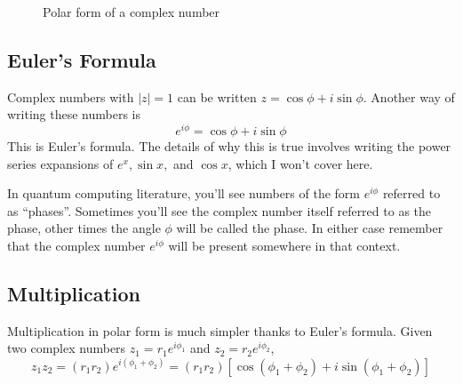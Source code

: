 \begin{figure}[h]
    \centering 
    \caption{Polar form of a complex number}
\end{figure}

\subsection{Euler's Formula}
Complex numbers with $|z| = 1$ can be written \( z = \cos\phi + i\sin\phi \).
Another way of writing these numbers is 
\[ e^{i\phi} = \cos\phi + i\sin\phi \]
This is Euler's formula. The details of why this is true involves writing the power series expansions 
of \(e^x, \sin x, \) and \(\cos x\), which I won't cover here.

In quantum computing literature, you'll see numbers of the form \(e^{i\phi}\) referred to as ``phases''.
Sometimes you'll see the complex number itself referred to as the phase, other times the angle \(\phi\) 
will be called the phase. In either case remember that the complex number \(e^{i\phi}\) will be present
somewhere in that context.

\subsection{Multiplication}
Multiplication in polar form is much simpler thanks to Euler's formula. Given two complex numbers 
\(z_1 = r_1 e^{i\phi_1}\) and \(z_2 = r_2 e^{i\phi_2}\),
\[ z_1 z_2 = (r_1r_2) e^{i(\phi_1 + \phi_2)} = (r_1r_2)[\cos(\phi_1+\phi_2) + i\sin(\phi_1+\phi_2)] \]